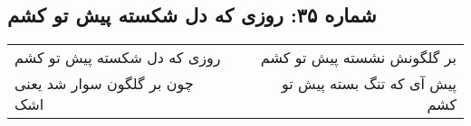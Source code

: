 \begin{center}
\section*{شماره ۳۵: روزی که دل شکسته پیش تو کشم}
\label{sec:035}
\begin{longtable}{l p{0.5cm} r}
روزی که دل شکسته پیش تو کشم
&&
بر گلگونش نشسته پیش تو کشم
\\
چون بر گلگون سوار شد یعنی اشک
&&
پیش آی که تنگ بسته پیش تو کشم
\\
\end{longtable}
\end{center}

